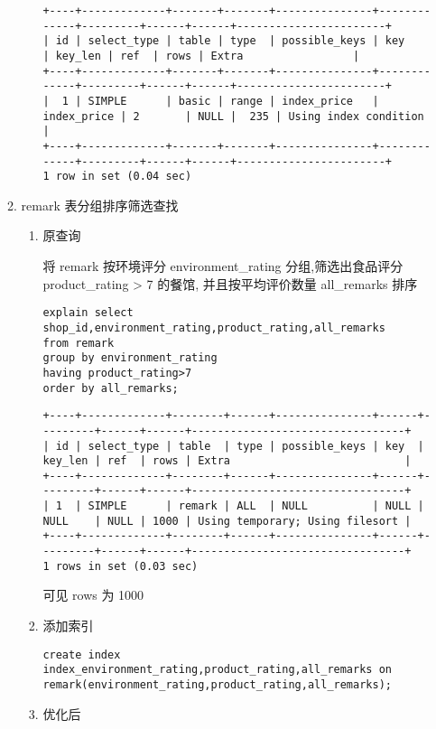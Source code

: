 \documentclass[11pt]{article}
\begin{document}
\begin{itemize}
\begin{enumerate}
\begin{enumerate}
\begin{verbatim}
+----+-------------+-------+-------+---------------+-------------+---------+------+------+-----------------------+
| id | select_type | table | type  | possible_keys | key         | key_len | ref  | rows | Extra                 |
+----+-------------+-------+-------+---------------+-------------+---------+------+------+-----------------------+
|  1 | SIMPLE      | basic | range | index_price   | index_price | 2       | NULL |  235 | Using index condition |
+----+-------------+-------+-------+---------------+-------------+---------+------+------+-----------------------+
1 row in set (0.04 sec)
\end{verbatim}
\end{enumerate}

\item remark 表分组排序筛选查找
\begin{enumerate}
\item 原查询

将 remark 按环境评分 environment\_rating 分组,筛选出食品评分 product\_rating
> 7 的餐馆, 并且按平均评价数量 all\_remarks 排序

\begin{lstlisting}
explain select shop_id,environment_rating,product_rating,all_remarks
from remark
group by environment_rating
having product_rating>7
order by all_remarks;
\end{lstlisting}

\begin{verbatim}
+----+-------------+--------+------+---------------+------+---------+------+------+---------------------------------+
| id | select_type | table  | type | possible_keys | key  | key_len | ref  | rows | Extra                           |
+----+-------------+--------+------+---------------+------+---------+------+------+---------------------------------+
| 1  | SIMPLE      | remark | ALL  | NULL          | NULL | NULL    | NULL | 1000 | Using temporary; Using filesort |
+----+-------------+--------+------+---------------+------+---------+------+------+---------------------------------+
1 rows in set (0.03 sec)
\end{verbatim}

可见 rows 为 1000
\item 添加索引

\begin{lstlisting}
create index index_environment_rating,product_rating,all_remarks on remark(environment_rating,product_rating,all_remarks);
\end{lstlisting}
\item 优化后


\end{enumerate}
\end{enumerate}
\end{itemize}
\end{document}
